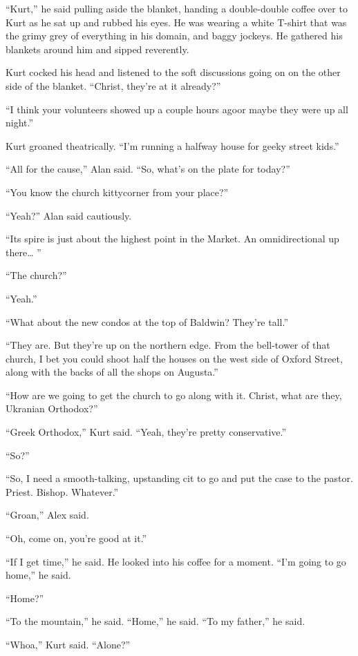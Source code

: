 ``Kurt,'' he said pulling aside the blanket, handing a double-double
coffee over to Kurt as he sat up and rubbed his eyes.  He was wearing
a white T-shirt that was the grimy grey of everything in his domain,
and baggy jockeys.  He gathered his blankets around him and sipped
reverently.

Kurt cocked his head and listened to the soft discussions going on on
the other side of the blanket.  ``Christ, they're at it already?''

``I think your volunteers showed up a couple hours ago\dash{}or maybe they
were up all night.''

Kurt groaned theatrically.  ``I'm running a halfway house for geeky
street kids.''

``All for the cause,'' Alan said.  ``So, what's on the plate for
today?''

``You know the church kittycorner from your place?''

``Yeah?'' Alan said cautiously.

``Its spire is just about the highest point in the Market.  An
omnidirectional up there\ldots{}  ''

``The church?''

``Yeah.''

``What about the new condos at the top of Baldwin?  They're tall.''

``They are.  But they're up on the northern edge.  From the bell-tower
of that church, I bet you could shoot half the houses on the west side
of Oxford Street, along with the backs of all the shops on Augusta.''

``How are we going to get the church to go along with it.  Christ,
what are they, Ukranian Orthodox?''

``Greek Orthodox,'' Kurt said.  ``Yeah, they're pretty conservative.''

``So?''

``So, I need a smooth-talking, upstanding cit to go and put the case
to the pastor.  Priest.  Bishop.  Whatever.''

``Groan,'' Alex said.

``Oh, come on, you're good at it.''

``If I get time,'' he said.  He looked into his coffee for a moment. 
``I'm going to go home,'' he said.

``Home?''

``To the mountain,'' he said.  ``Home,'' he said.  ``To my father,''
he said.

``Whoa,'' Kurt said.  ``Alone?''

